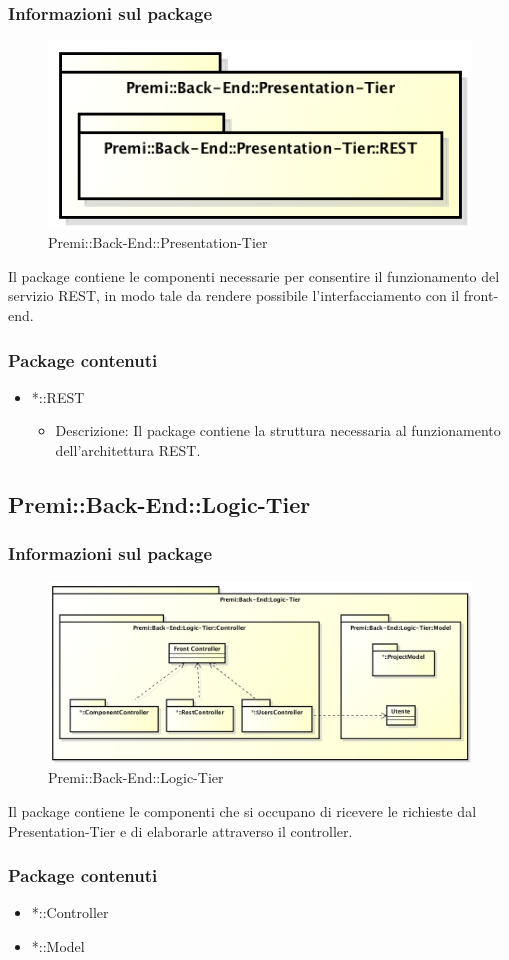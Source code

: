 	\subsubsection{Informazioni sul package}
		\begin{figure}[h]
			\centering
			\includegraphics[width=0.7\linewidth]{img/back-end-package_presentation-tier}
			\caption[Premi::Back-End::Presentation-Tier]{Premi::Back-End::Presentation-Tier}
		\end{figure}
		Il package contiene le componenti necessarie per consentire il funzionamento del servizio REST, in modo tale da rendere possibile l'interfacciamento con il front-end.
		
	\subsubsection{Package contenuti}
		\begin{itemize}
			\item *::REST
			\begin{itemize}
				\item Descrizione: Il package contiene la struttura necessaria al funzionamento dell'architettura REST.
			\end{itemize}
		\end{itemize}
		
		
\subsection{Premi::Back-End::Logic-Tier}
	\subsubsection{Informazioni sul package}
	\begin{figure}[h]
		\centering
		\includegraphics[width=0.7\linewidth]{img/back-end-package_logic-tier}
		\caption[Premi::Back-End::Logic-Tier]{Premi::Back-End::Logic-Tier}
	\end{figure}
	Il package contiene le componenti che si occupano di ricevere le richieste dal Presentation-Tier e di elaborarle attraverso il controller.
	
	\subsubsection{Package contenuti}
	\begin{itemize}
		\item *::Controller
		\item *::Model
	\end{itemize}